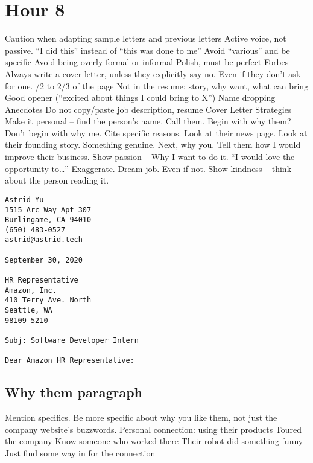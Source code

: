 \section{Hour 8}

\begin{outline}
    \1 Caution when adapting sample letters and previous letters 
    \1 Active voice, not passive. ``I did this'' instead of ``this was done to me''
    \1 Avoid ``various'' and be specific
    \1 Avoid being overly formal or informal
    \1 Polish, must be perfect
    \1 Forbes 
        \2 Always write a cover letter, unless they explicitly say no. Even if they don't ask for one.
        /2 to 2/3 of the page 
        \2 Not in the resume: story, why want, what can bring 
        \2 Good opener (``excited about things I could bring to X'')
        \2 Name dropping 
        \2 Anecdotes
        \2 Do not copy/paste job description, resume
    \1 Cover Letter Strategies 
        \2 Make it personal -- find the person's name. Call them.
        \2 Begin with why them? Don't begin with why me. Cite specific reasons. Look at their news page. Look at their founding story. Something genuine.
        \2 Next, why you. Tell them how I would improve their business.
        \2 Show passion -- Why I want to do it. ``I would love the opportunity to\dots'' Exaggerate. Dream job. Even if not.
        \2 Show kindness -- think about the person reading it. 
\end{outline}

\begin{verbatim}
Astrid Yu
1515 Arc Way Apt 307
Burlingame, CA 94010
(650) 483-0527
astrid@astrid.tech

September 30, 2020

HR Representative
Amazon, Inc.
410 Terry Ave. North
Seattle, WA
98109-5210

Subj: Software Developer Intern

Dear Amazon HR Representative:
\end{verbatim}

\subsection{Why them paragraph}

\begin{outline}
    \1 Mention specifics. Be more specific about why you like them, not just the company website's buzzwords.
        \2 Personal connection: using their products
        \2 Toured the company 
        \2 Know someone who worked there 
        \2 Their robot did something funny
        \2 Just find some way in for the connection 
    \1 
\end{outline}